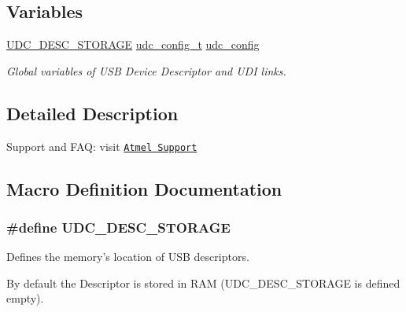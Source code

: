 \subsection*{Variables}
\begin{DoxyCompactItemize}
\item 
\hypertarget{group__udc__desc__group_ga40ae5a61fbfa7e289136b2f9fd190217}{\hyperlink{group__udc__desc__group_gae086959cec07a2e71ab069e25a51764f}{U\-D\-C\-\_\-\-D\-E\-S\-C\-\_\-\-S\-T\-O\-R\-A\-G\-E} \hyperlink{structudc__config__t}{udc\-\_\-config\-\_\-t} \hyperlink{group__udc__desc__group_ga40ae5a61fbfa7e289136b2f9fd190217}{udc\-\_\-config}}\label{group__udc__desc__group_ga40ae5a61fbfa7e289136b2f9fd190217}

\begin{DoxyCompactList}\small\item\em Global variables of U\-S\-B Device Descriptor and U\-D\-I links. \end{DoxyCompactList}\end{DoxyCompactItemize}


\subsection{Detailed Description}
Support and F\-A\-Q\-: visit \href{http://www.atmel.com/design-support/}{\tt Atmel Support} 

\subsection{Macro Definition Documentation}
\hypertarget{group__udc__desc__group_gae086959cec07a2e71ab069e25a51764f}{
\subsubsection[{U\-D\-C\-\_\-\-D\-E\-S\-C\-\_\-\-S\-T\-O\-R\-A\-G\-E}]{\setlength{\rightskip}{0pt plus 5cm}\#define U\-D\-C\-\_\-\-D\-E\-S\-C\-\_\-\-S\-T\-O\-R\-A\-G\-E}}\label{group__udc__desc__group_gae086959cec07a2e71ab069e25a51764f}


Defines the memory's location of U\-S\-B descriptors. 

By default the Descriptor is stored in R\-A\-M (U\-D\-C\-\_\-\-D\-E\-S\-C\-\_\-\-S\-T\-O\-R\-A\-G\-E is defined empty).

